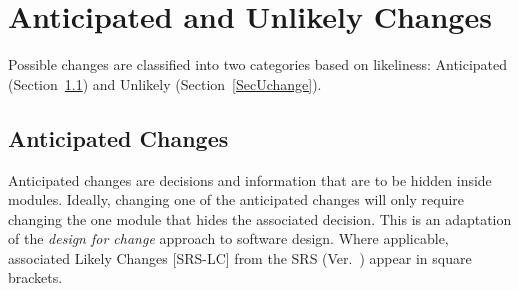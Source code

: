 \section{Anticipated and Unlikely Changes}\label{SecChange}
Possible changes are classified into two categories based on likeliness:
Anticipated (Section~\ref{SecAchange}) and Unlikely (Section~\ref{SecUchange}).

\subsection{Anticipated Changes}\label{SecAchange}
Anticipated changes are decisions and information that are to be hidden
inside modules. Ideally, changing one of the anticipated changes will only
require changing the one module that hides the associated decision. This is an
adaptation of the \textit{design for change} approach to software design. Where
applicable, associated Likely Changes [SRS-LC] from the SRS (Ver.~\srsVersion)
appear in square brackets.


